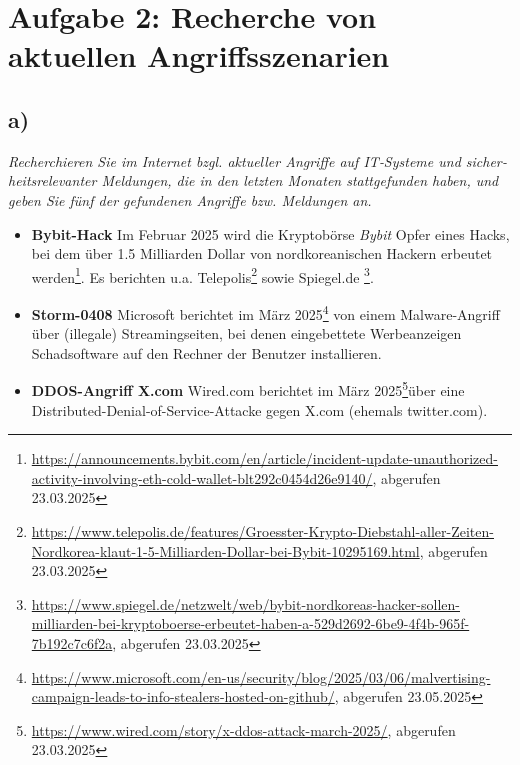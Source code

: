 \chapter{Aufgabe 2:  Recherche von aktuellen Angriffsszenarien}

\section{a)}

\textit{Recherchieren Sie im Internet bzgl. aktueller Angriffe auf IT‐Systeme und sicher‐
heitsrelevanter Meldungen, die in den letzten Monaten stattgefunden haben, und geben Sie fünf der gefundenen Angriffe bzw. Meldungen an. }

\vspace{5mm}

\begin{itemize}
    \itemsep0.5em
    \item \textbf{Bybit-Hack} Im Februar 2025 wird die Kryptobörse \textit{Bybit} Opfer eines Hacks, bei dem über 1.5 Milliarden Dollar von nordkoreanischen Hackern erbeutet werden\footnote{
    \url{https://announcements.bybit.com/en/article/incident-update-unauthorized-activity-involving-eth-cold-wallet-blt292c0454d26e9140/}, abgerufen 23.03.2025
    }. Es berichten u.a. Telepolis\footnote{
        \url{https://www.telepolis.de/features/Groesster-Krypto-Diebstahl-aller-Zeiten-Nordkorea-klaut-1-5-Milliarden-Dollar-bei-Bybit-10295169.html}, abgerufen 23.03.2025
    } sowie Spiegel.de \footnote{
        \url{https://www.spiegel.de/netzwelt/web/bybit-nordkoreas-hacker-sollen-milliarden-bei-kryptoboerse-erbeutet-haben-a-529d2692-6be9-4f4b-965f-7b192c7c6f2a}, abgerufen 23.03.2025
    }.
    \item \textbf{Storm-0408} Microsoft berichtet im März 2025\footnote{
    \url{https://www.microsoft.com/en-us/security/blog/2025/03/06/malvertising-campaign-leads-to-info-stealers-hosted-on-github/}, abgerufen 23.05.2025
    } von einem Malware-Angriff über (illegale) Streamingseiten, bei denen eingebettete Werbeanzeigen Schadsoftware auf den Rechner der Benutzer installieren.
    \item \textbf{DDOS-Angriff X.com} Wired.com berichtet im März 2025\footnote{
    \url{https://www.wired.com/story/x-ddos-attack-march-2025/}, abgerufen 23.03.2025
    }über eine Distributed-Denial-of-Service-Attacke gegen X.com (ehemals twitter.com).


\end{itemize}
